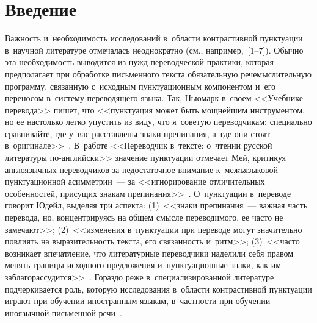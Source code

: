   


  



\thispagestyle{headings}

\begin{multicols}{2}

\label{st\stat}
    
    \section{Введение}
    
    \vspace*{-3pt}
    
  Важность и~необходимость исследований в~области контрастивной 
пунктуации в~научной литературе отмечалась неоднократно (см., 
например,~[1--7]). Обычно эта необходимость выводится из нужд 
переводческой практики, которая предполагает при обработке письменного 
текста обязательную речемыслительную программу, связанную с~исходным 
пунктуационным компонентом и~его переносом в~сис\-те\-му переводящего 
языка. Так, Ньюмарк в~своем <<Учебнике перевода>> пишет, что 
<<пунктуация может быть мощнейшим инструментом, но ее настолько легко 
упус\-тить из виду, что я~советую переводчикам: специально сравнивайте, где 
у~вас рас\-став\-ле\-ны знаки препинания, а~где они стоят 
в~оригинале>>~\cite[с.~58]{4-nu}. В~работе <<Переводчик в~текс\-те: 
о~чтении русской литературы  
по-анг\-лий\-ски>> значение пунктуации отмечает Мей, критикуя 
англоязычных переводчиков за недостаточное внимание к~межъязыковой 
пунктуационной асим\-мет\-рии~--- за <<игнорирование отличительных 
особенностей, присущих знакам препинания>>~\cite[с.~121]{2-nu}. 
О~пунктуации в~переводе говорит Юдейл, выделяя три аспекта:
(1)~<<знаки препинания~--- важ\-ная часть перевода, но, концентрируясь на 
общем смыс\-ле переводимого, ее час\-то не замечают>>; 
(2)~<<изменения 
в~пунктуации при переводе могут значительно по\-вли\-ять на вы\-ра\-зи\-тель\-ность 
текс\-та, его свя\-зан\-ность и~ритм>>; 
(3)~<<час\-то возникает впечатление, что 
литературные переводчики наделили себя правом менять границы исходного 
предложения и~пунктуационные знаки, как им 
заблагорассудится>>~\cite[с.~121]{5-nu}.
 Гораздо реже 
в~специализированной литературе подчеркивается роль, которую 
исследования в~об\-ласти контрастивной пунктуации играют при обучении 
иностранным языкам, в~част\-ности при обуче\-нии иноязычной письменной 
речи~\cite{7-nu}.
  

\end{multicols}
